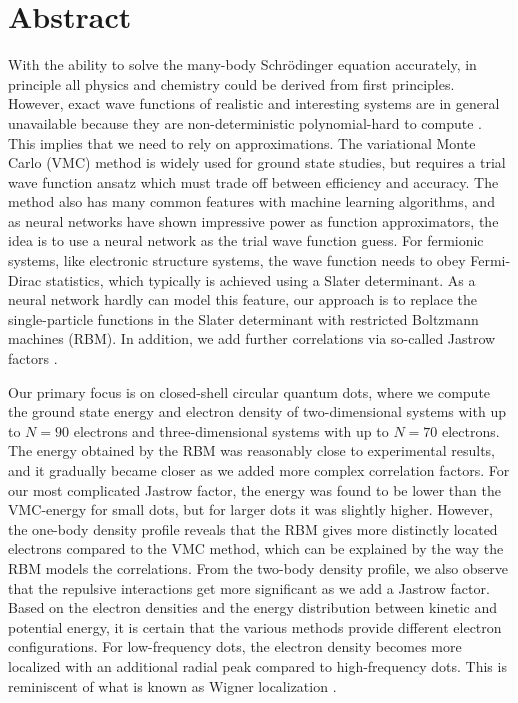 \newpage
\section*{Abstract}
With the ability to solve the many-body Schrödinger equation accurately, in principle all physics and chemistry could be derived from first principles. However, exact wave functions of realistic and interesting systems are in general unavailable because they are non-deterministic polynomial-hard to compute \supercite{troyer_computational_2005}. This implies that we need to rely on approximations. The variational Monte Carlo (VMC) method is widely used for ground state studies, but requires a trial wave function ansatz which must trade off between efficiency and accuracy. The method also has many common features with machine learning algorithms, and as neural networks have shown impressive power as function approximators, the idea is to use a neural network as the trial wave function guess. For fermionic systems, like electronic structure systems, the wave function needs to obey Fermi-Dirac statistics, which typically is achieved using a Slater determinant. As a neural network hardly can model this feature, our approach is to replace the single-particle functions in the Slater determinant with restricted Boltzmann machines (RBM). In addition, we add further correlations via so-called Jastrow factors \supercite{drummond_jastrow_2004}.

Our primary focus is on closed-shell circular quantum dots, where we compute the ground state energy and electron density of two-dimensional systems with up to $N=90$ electrons and three-dimensional systems with up to $N=70$ electrons. The energy obtained by the RBM was reasonably close to experimental results, and it gradually became closer as we added more complex correlation factors. For our most complicated Jastrow factor, the energy was found to be lower than the VMC-energy for small dots, but for larger dots it was slightly higher. However, the one-body density profile reveals that the RBM gives more distinctly located electrons compared to the VMC method, which can be explained by the way the RBM models the correlations. From the two-body density profile, we also observe that the repulsive interactions get more significant as we add a Jastrow factor. Based on the electron densities and the energy distribution between kinetic and potential energy, it is certain that the various methods provide different electron configurations. For low-frequency dots, the electron density becomes more localized with an additional radial peak compared to high-frequency dots. This is reminiscent of what is known as Wigner localization \supercite{ghosal_incipient_2007}.

